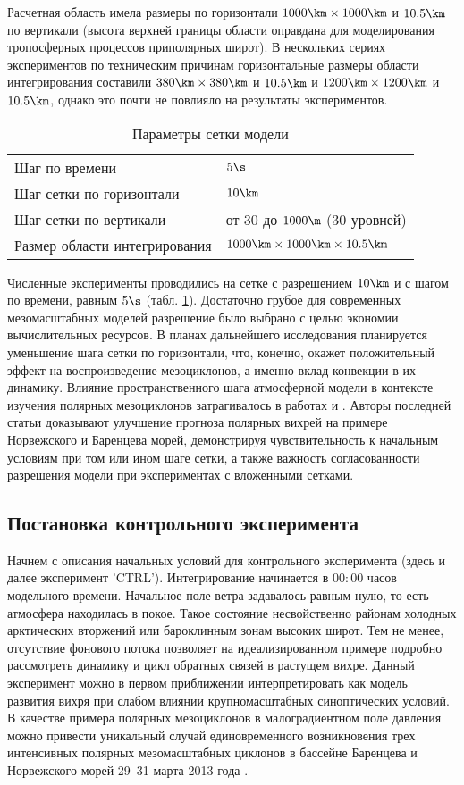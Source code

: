 Расчетная область имела размеры по горизонтали $1000\km \times 1000\km$ и $10.5\km$ по вертикали (высота верхней границы области оправдана для моделирования тропосферных процессов приполярных широт). В нескольких сериях экспериментов по техническим причинам горизонтальные размеры области интегрирования составили $380\km \times 380\km$ и $10.5\km$ и $1200\km \times 1200\km$ и $10.5\km$, однако это почти не повлияло на результаты экспериментов.

\begin{table}[!ht]
\centering
\caption{Параметры сетки модели}
\label{tab:modelgrid}
\begin{tabular}{ll}
\toprule
Шаг по времени & $5\s$ \\
Шаг сетки по горизонтали & $10\km$ \\
Шаг сетки по вертикали & от $30$ до $1000\m$ (30 уровней) \\
Размер области интегрирования	& $1000\km \times 1000\km \times 10.5\km$ \\
\bottomrule
\end{tabular}
\end{table}

Численные эксперименты проводились на сетке с разрешением $10\km$ и с шагом по времени, равным $5\s$ (табл. \ref{tab:modelgrid}). Достаточно грубое для современных мезомасштабных моделей разрешение было выбрано с целью экономии вычислительных ресурсов. В планах дальнейшего исследования планируется уменьшение шага сетки по горизонтали, что, конечно, окажет положительный эффект на воспроизведение мезоциклонов, а именно вклад конвекции в их динамику. Влияние пространственного шага атмосферной модели в контексте изучения полярных мезоциклонов затрагивалось в работах \citep{YanaseNiino2005} и \citep{McInnesEtAl2011}. Авторы последней статьи доказывают улучшение прогноза полярных вихрей на примере Норвежского и Баренцева морей, демонстрируя чувствительность к начальным условиям при том или ином шаге сетки, а также важность согласованности разрешения модели при экспериментах с вложенными сетками.

\subsection{Постановка контрольного эксперимента}
\label{sec:expsetup:ctrl}
Начнем с описания начальных условий для контрольного эксперимента (здесь и далее эксперимент 'CTRL'). Интегрирование начинается в $00:00$ часов модельного времени. Начальное поле ветра задавалось равным нулю, то есть атмосфера находилась в покое. Такое состояние несвойственно районам холодных арктических вторжений или бароклинным зонам высоких широт. Тем не менее, отсутствие фонового потока позволяет на идеализированном примере подробно рассмотреть динамику и цикл обратных связей в растущем вихре. Данный эксперимент можно в первом приближении интерпретировать как модель развития вихря при слабом влиянии крупномасштабных синоптических условий. В качестве примера полярных мезоциклонов в малоградиентном поле давления можно привести уникальный случай единовременного возникновения трех интенсивных полярных мезомасштабных циклонов в бассейне Баренцева и Норвежского морей 29--31 марта
2013 года \citep{Verezemskaya2014}.

